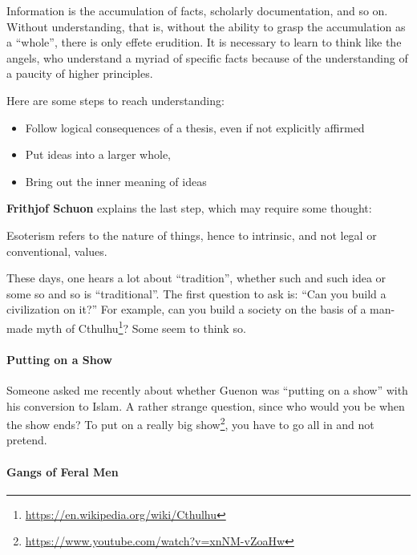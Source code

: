 Information is the accumulation of facts, scholarly documentation, and so on. Without understanding, that is, without the ability to grasp the accumulation as a ``whole'', there is only effete erudition. It is necessary to learn to think like the angels, who understand a myriad of specific facts because of the understanding of a paucity of higher principles.

Here are some steps to reach understanding:

\begin{itemize}


\item Follow logical consequences of a thesis, even if not explicitly affirmed

\item Put ideas into a larger whole,

\item Bring out the inner meaning of ideas
\end{itemize}


\textbf{Frithjof Schuon} explains the last step, which may require some thought:

\begin{quotex}
Esoterism refers to the nature of things, hence to intrinsic, and not legal or conventional, values.
\end{quotex}


These days, one hears a lot about ``tradition'', whether such and such idea or some so and so is ``traditional''. The first question to ask is: ``Can you build a civilization on it?'' For example, can you build a society on the basis of a man-made myth of Cthulhu\footnote{\url{https://en.wikipedia.org/wiki/Cthulhu}}? Some seem to think so.

\paragraph{Putting on a Show}


Someone asked me recently about whether Guenon was ``putting on a show'' with his conversion to Islam. A rather strange question, since who would you be when the show ends? To put on a really big show\footnote{\url{https://www.youtube.com/watch?v=xnNM-vZoaHw}}, you have to go all in and not pretend.

\paragraph{Gangs of Feral Men}


